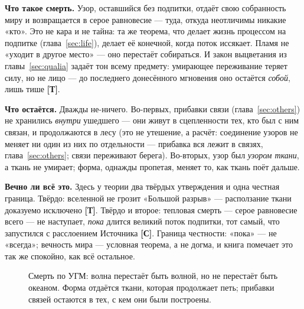 \documentclass[11pt,letterpaper]{article}
\newcommand{\stT}{\textbf{[Т]}\xspace}
\newcommand{\stC}{\textbf{[С]}\xspace}
\begin{document}
\textbf{Что такое смерть.} Узор, оставшийся без подпитки, отдаёт
свою собранность миру и возвращается в серое равновесие --- туда,
откуда неотличимы никакие «кто». Это не кара и не тайна: та же
теорема, что делает жизнь процессом на подпитке
(глава~\ref{sec:life}), делает её конечной, когда поток иссякает.
Пламя не «уходит в другое место» --- оно перестаёт собираться. И
закон выцветания из главы~\ref{sec:qualia} задаёт тон всему
предмету: умирающее переживание теряет силу, но не лицо --- до
последнего донесённого мгновения оно остаётся \emph{собой}, лишь
тише \stT.

\textbf{Что остаётся.} Дважды не-ничего. Во-первых, прибавки связи
(глава~\ref{sec:others}) не хранились \emph{внутри} ушедшего --- они
живут в сцепленности тех, кто был с ним связан, и продолжаются в
лесу (это не утешение, а расчёт: соединение узоров не меняет ни один
из них по отдельности --- прибавка вся лежит в связях,
глава~\ref{sec:others}; связи переживают берега). Во-вторых, узор был \emph{узором ткани}, а ткань не умирает;
форма, однажды пропетая, меняет то, как ткань поёт дальше.

\textbf{Вечно ли всё это.} Здесь у теории два твёрдых утверждения
и одна честная граница. Твёрдо: вселенной не грозит «Большой
разрыв» --- расползание ткани доказуемо исключено \stT. Твёрдо и
второе: тепловая смерть --- серое равновесие всего --- не наступает,
\emph{пока} длится великий поток подпитки, тот самый, что запустился
с расслоением Источника \stC. Граница честности: «пока» --- не
«всегда»; вечность мира --- условная теорема, а не догма, и книга
помечает это так же спокойно, как всё остальное.

\begin{figure}[H]
\centering
{}
\caption{Смерть по УГМ: волна перестаёт быть волной, но не перестаёт
быть океаном. Форма отдаётся ткани, которая продолжает петь; прибавки
связей остаются в тех, с кем они были построены.}
\label{fig:wave}
\end{figure}
\end{document}
